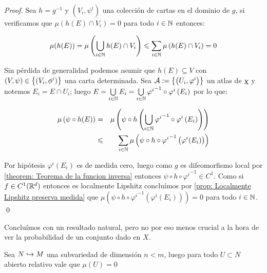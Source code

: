 \begin{proof}
	Sea $h = g^{-1}$ y $\left(V_i, \psi^i\right)$ una colecci\'on de cartas en el dominio de $g$, si verificamos que $\mu\left(h\left(E\right) \cap V_i\right) = 0$ para todo $i \in {\mathbb{N}}$ entonces:
	
	\begin{equation*}
	\mu(h(E)) = \mu \left(\bigcup\limits_{i \in {\mathbb{N}}}{h(E) \cap V_i}\right) \leqslant \sum\limits_{i \in {\mathbb{N}}}{\mu} \left(h(E) \cap V_i\right) = 0
	\end{equation*}
	
	Sin p\'erdida de generalidad podemos asumir que $h(E) \subseteq V$ con $(V, \psi) \in \left\lbrace(V_i, \phi^i)\right\rbrace$ una carta determinada. Sea $\mathcal{A} := \left\lbrace\left(U_i, \varphi^i \right)\right\rbrace$ un atlas de $\upchi$ y notemos $E_i = E \cap U_i$; luego $E = \bigcup\limits_{i \in {\mathbb{N}}}{E_i} = \bigcup\limits_{i \in {\mathbb{N}}}{{\varphi^i}^{-1} \circ \varphi^{i} \left(E_i\right)}$ por lo que:
	
	\begin{equation*}
	\begin{aligned}
	\mu\left(\psi \circ h(E)\right) & = & \mu \left(\psi \circ h \left(\bigcup\limits_{i \in {\mathbb{N}}}{{\varphi^i}^{-1} \circ \varphi^{i} \left(E_i\right)}\right)\right)\\
	& \leqslant & \sum\limits_{i \in {\mathbb{N}}}{\mu \left(\psi \circ h \circ {\varphi^{i}}^{-1} \left(\varphi^i (E_i)\right)\right)}
	\end{aligned}
	\end{equation*}
	
	Por hip\'otesis $\varphi^i(E_i)$ es de medida cero, luego como $g$ es difeomorfismo local por \ref{theorem: Teorema de la funcion inversa}  entonces $\psi \circ h \circ {\varphi^{i}}^{-1} \in C^1$. Como si $f \in C^1({\mathbb{R}}^d)$ entonces es localmente Lipshitz conclu\'imos por \ref{prop: Localmente Lipshitz preserva medida} que ${\mu \left(\psi \circ h \circ {\varphi^{i}}^{-1} \left(\varphi^i (E_i)\right)\right)} = 0$ para todo $i \in {\mathbb{N}}$. \qed
	
\end{proof}

Conclu\'imos con un resultado natural, pero no por eso menos crucial a la hora de ver la probabilidad de un conjunto dado en $X$.

\begin{proposition}
	\label{prop: Dimension menor tiene medida 0}
	Sea $N \hookrightarrow M$ una subvariedad de dimensi\'on $n < m$, luego para todo $U \subset N$ abierto relativo vale que $\mu(U) = 0$
\end{proposition}

